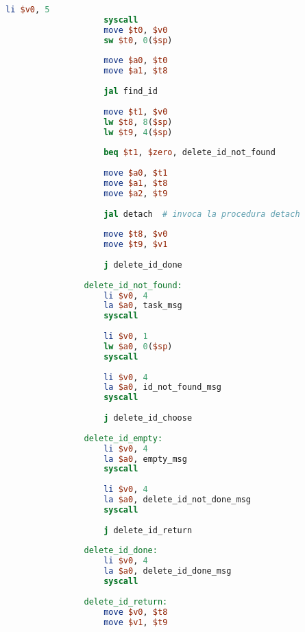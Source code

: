 \begin{center}
\begin{lstlisting}[language=mips, gobble=14, stepnumber=1]
                    li $v0, 5
                    syscall
                    move $t0, $v0
                    sw $t0, 0($sp)
                    
                    move $a0, $t0
                    move $a1, $t8
                    
                    jal find_id
                    
                    move $t1, $v0
                    lw $t8, 8($sp)
                    lw $t9, 4($sp)
                    
                    beq $t1, $zero, delete_id_not_found
                
                    move $a0, $t1
                    move $a1, $t8
                    move $a2, $t9
                    
                    jal detach  # invoca la procedura detach
                    
                    move $t8, $v0
                    move $t9, $v1
                    
                    j delete_id_done
                
                delete_id_not_found:
                    li $v0, 4
                    la $a0, task_msg
                    syscall
                    
                    li $v0, 1
                    lw $a0, 0($sp)
                    syscall
                    
                    li $v0, 4
                    la $a0, id_not_found_msg
                    syscall
                    
                    j delete_id_choose
                    
                delete_id_empty:
                    li $v0, 4
                    la $a0, empty_msg
                    syscall
                    
                    li $v0, 4
                    la $a0, delete_id_not_done_msg
                    syscall
                    
                    j delete_id_return
                    
                delete_id_done:
                    li $v0, 4
                    la $a0, delete_id_done_msg
                    syscall
                
                delete_id_return:
                    move $v0, $t8
                    move $v1, $t9
                    

\end{lstlisting}
\end{center}
